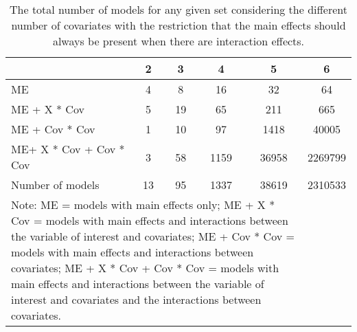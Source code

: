 \begin{table}[!h]
\centering
\caption{The total number of models for any given set considering the different number of covariates with the restriction that the main effects should always be present when there are interaction effects.} 
\begin{tabular}{lccccc}
  \hline
 & 2 & 3 & 4 & 5 & 6 \\ 
  \hline
ME & 4 & 8 & 16 & 32 & 64 \\ 
  ME + X * Cov & 5 & 19 & 65 & 211 & 665 \\ 
  ME + Cov * Cov & 1 & 10 & 97 & 1418 & 40005 \\ 
  ME+ X * Cov + Cov * Cov & 3 & 58 & 1159 & 36958 & 2269799 \\ 
  Number of models & 13 & 95 & 1337 & 38619 & 2310533 \\ 
   \hline 
\multicolumn{5}{p{10cm}}{\footnotesize{Note: ME = models with main effects only; ME + X * Cov = models with main effects and interactions between the variable of interest and covariates; ME + Cov * Cov = models with main effects and interactions between covariates; ME + X * Cov + Cov * Cov = models with main effects and interactions between the variable of interest and covariates and the interactions between covariates.}} 
 \hline
\end{tabular}
\end{table}
